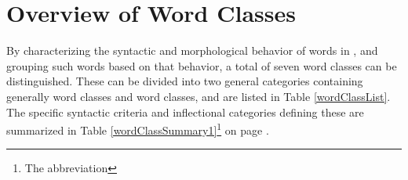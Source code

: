 %





\chapter{Overview of Word Classes}\label{introWordForms}
By characterizing the syntactic and morphological behavior of %
words in \PS, and grouping such words based on that behavior, a total of seven word classes can be distinguished. These can be divided into two general categories containing generally  word classes and  word classes, and are listed in Table \ref{wordClassList}. 
The specific syntactic criteria and inflectional categories defining these are summarized in Table \ref{wordClassSummary1}\footnote{The abbreviation} 
on page \pageref{wordClassSummary1}. %
